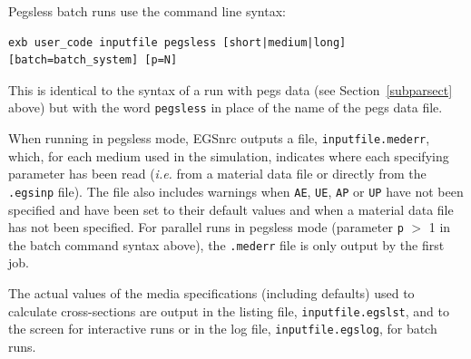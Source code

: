 \documentclass[12pt,twoside]{article}  %
\begin{document}
Pegsless batch runs use the command line syntax:
\begin{verbatim}
exb user_code inputfile pegsless [short|medium|long] [batch=batch_system] [p=N]
\end{verbatim}
This is identical to the syntax of a run with pegs data (see Section~\ref{subparsect} above) but
with the word {\tt pegsless} in place of the name of the pegs data file.

When running in pegsless mode, EGSnrc outputs a file, {\tt inputfile.mederr}, which, for each medium used
in the simulation, indicates where each specifying parameter has been read ({\it i.e.} from a material data
file or directly from the {\tt .egsinp} file).  The file also includes warnings when {\tt AE}, {\tt UE},
{\tt AP} or {\tt UP} have not been specified and have been set to their default values and when a material
data file has not been specified.  For parallel runs in pegsless mode (parameter {\tt p} $>$ 1 in the batch
command syntax above), the {\tt .mederr} file is only output by the first job.

The actual values of the media specifications (including defaults) used to calculate cross-sections are
output in the listing file, {\tt inputfile.egslst}, and to the screen for interactive runs or in the
log file, {\tt inputfile.egslog}, for batch runs.
\end{document}

